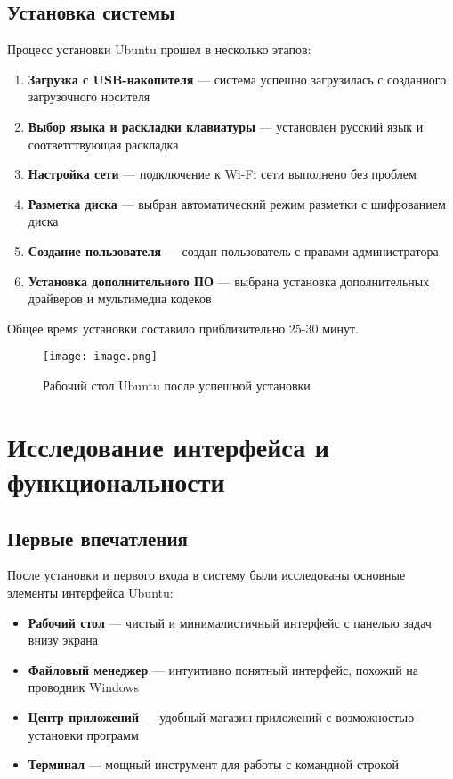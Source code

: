 \subsection{Установка системы}

Процесс установки Ubuntu прошел в несколько этапов:

\begin{enumerate}
    \item \textbf{Загрузка с USB-накопителя} --- система успешно загрузилась с созданного загрузочного носителя
    \item \textbf{Выбор языка и раскладки клавиатуры} --- установлен русский язык и соответствующая раскладка
    \item \textbf{Настройка сети} --- подключение к Wi-Fi сети выполнено без проблем
    \item \textbf{Разметка диска} --- выбран автоматический режим разметки с шифрованием диска
    \item \textbf{Создание пользователя} --- создан пользователь с правами администратора
    \item \textbf{Установка дополнительного ПО} --- выбрана установка дополнительных драйверов и мультимедиа кодеков
\end{enumerate}

Общее время установки составило приблизительно 25-30 минут.

\begin{figure}[H]
    \centering
    \texttt{[image: image.png]}
    \caption{Рабочий стол Ubuntu после успешной установки}
    \label{fig:ubuntu_desktop}
\end{figure}

\section{Исследование интерфейса и функциональности}

\subsection{Первые впечатления}

После установки и первого входа в систему были исследованы основные элементы интерфейса Ubuntu:

\begin{itemize}
    \item \textbf{Рабочий стол} --- чистый и минималистичный интерфейс с панелью задач внизу экрана
    \item \textbf{Файловый менеджер} --- интуитивно понятный интерфейс, похожий на проводник Windows
    \item \textbf{Центр приложений} --- удобный магазин приложений с возможностью установки программ
    \item \textbf{Терминал} --- мощный инструмент для работы с командной строкой
\end{itemize}

